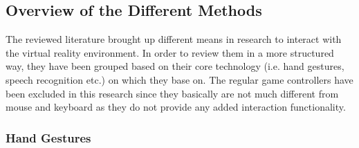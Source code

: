 \subsection{Overview of the Different Methods}

The reviewed literature brought up different means in research to interact with the virtual reality environment. In order to review them in a more structured way, they have been grouped based on their core technology (i.e. hand gestures, speech recognition etc.) on which they base on. The regular game controllers have been excluded in this research since they basically are not much different from mouse and keyboard as they do not provide any added interaction functionality.


\subsubsection{Hand Gestures}

\label{SubSubSectionHandGestures}

